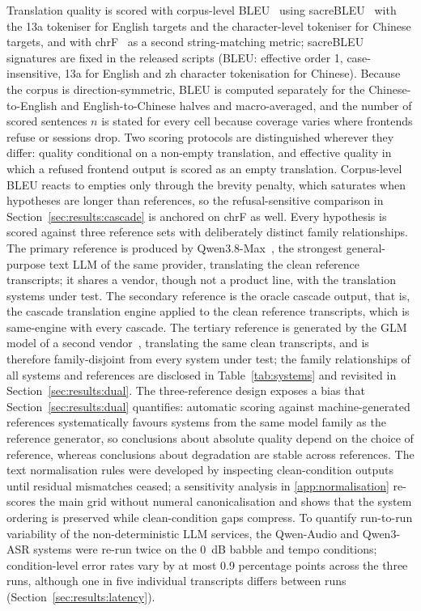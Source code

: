 Translation quality is scored with corpus-level BLEU~\citep{papineni2002bleu}
using sacreBLEU~\citep{post2018call} with the 13a tokeniser for English
targets and the character-level tokeniser for Chinese targets, and with
chrF~\citep{popovic2015chrf} as a second string-matching metric; sacreBLEU
signatures are fixed in the released scripts (BLEU: effective order 1,
case-insensitive, 13a for English and zh character tokenisation for
Chinese). Because the
corpus is direction-symmetric, BLEU is computed separately for the
Chinese-to-English and English-to-Chinese halves and macro-averaged, and
the number of scored sentences $n$ is stated for every cell because
coverage varies where frontends refuse or sessions drop. Two scoring
protocols are distinguished wherever they differ: quality conditional on a
non-empty translation, and effective quality in which a refused frontend
output is scored as an empty translation. Corpus-level BLEU reacts to
empties only through the brevity penalty, which saturates when hypotheses
are longer than references, so the refusal-sensitive comparison in
Section~\ref{sec:results:cascade} is anchored on chrF as well. Every
hypothesis is scored against three reference sets with deliberately
distinct family relationships. The primary reference is
produced by Qwen3.8-Max~\citep{qwen3technical2025}, the strongest
general-purpose text LLM of the same provider, translating the clean
reference transcripts; it shares a vendor, though not a product line, with
the translation systems under test. The secondary reference is the oracle
cascade output, that is, the cascade translation engine applied to the clean
reference transcripts, which is same-engine with every cascade. The
tertiary reference is generated by the GLM model of a second
vendor~\citep{glm2026api,glm2025tech},
translating the same clean transcripts,
and is therefore family-disjoint from every system under test; the family
relationships of all systems and references are disclosed in
Table~\ref{tab:systems} and revisited in
Section~\ref{sec:results:dual}. The three-reference design exposes a bias
that Section~\ref{sec:results:dual} quantifies: automatic scoring against
machine-generated references systematically favours systems from the same
model family as the reference generator, so conclusions about absolute
quality depend on the choice of reference, whereas conclusions about
degradation are stable across references. The text normalisation rules were developed by
inspecting clean-condition outputs until residual mismatches ceased; a
sensitivity analysis in \ref{app:normalisation} re-scores the
main grid without numeral canonicalisation and shows that the
system ordering is preserved while clean-condition gaps compress. To
quantify run-to-run variability of the non-deterministic LLM services, the
Qwen-Audio and Qwen3-ASR systems were re-run twice on the 0~dB babble and
tempo conditions; condition-level error rates vary by at most 0.9
percentage points across the three runs, although one in five individual
transcripts differs between runs (Section~\ref{sec:results:latency}).

